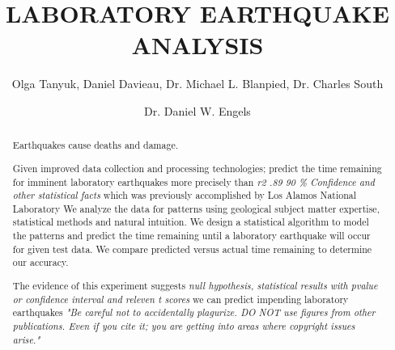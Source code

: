 \documentclass[]{llncs}
\begin{document}
\title{LABORATORY EARTHQUAKE ANALYSIS}
\author{Olga Tanyuk, Daniel Davieau, Dr. Michael L. Blanpied, Dr. Charles South \and Dr. Daniel W. Engels}
\maketitle
\begin{abstract}
Earthquakes cause deaths and damage. \par
Given improved data collection and processing technologies; predict the time remaining for imminent laboratory earthquakes more precisely than {\em r2 .89 90 \% Confidence and other statistical facts} which was previously accomplished by Los Alamos National Laboratory \cite{Bertrand}
We analyze the data for patterns using geological subject matter expertise, statistical methods and natural intuition. We design a statistical algorithm to model the patterns and predict the time remaining until a laboratory earthquake will occur for given test data. We compare predicted versus actual time remaining to determine our accuracy. \par
The evidence of this experiment suggests  {\em null hypothesis, statistical results with pvalue or confidence interval and releven t scores} we can predict impending laboratory earthquakes
{\em "Be careful not to accidentally plagurize. DO NOT use figures from other publications. Even if you cite it; you are getting into areas where copyright issues arise."}
\end{abstract}
\end{document}
